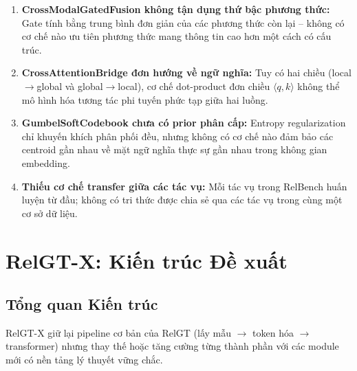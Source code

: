 \documentclass[12pt,a4paper]{article}
\begin{document}
\begin{warnbox}
\begin{enumerate}[leftmargin=1.2em]
  \item \textbf{CrossModalGatedFusion không tận dụng thứ bậc phương thức:}
        Gate tính bằng trung bình đơn giản của các phương thức còn lại
        -- không có cơ chế nào ưu tiên phương thức mang thông tin cao hơn
        một cách có cấu trúc.
  \item \textbf{CrossAttentionBridge đơn hướng về ngữ nghĩa:} Tuy có hai
        chiều (local$\to$global và global$\to$local), cơ chế dot-product đơn
        chiều $\langle q, k \rangle$ không thể mô hình hóa tương tác phi tuyến
        phức tạp giữa hai luồng.
  \item \textbf{GumbelSoftCodebook chưa có prior phân cấp:} Entropy
        regularization chỉ khuyến khích phân phối đều, nhưng không có cơ chế
        nào đảm bảo các centroid gần nhau về mặt ngữ nghĩa thực sự gần nhau
        trong không gian embedding.
  \item \textbf{Thiếu cơ chế transfer giữa các tác vụ:} Mỗi tác vụ trong
        RelBench huấn luyện từ đầu; không có tri thức được chia sẻ qua các
        tác vụ trong cùng một cơ sở dữ liệu.
\end{enumerate}
\end{warnbox}

\section{RelGT-X: Kiến trúc Đề xuất}

\subsection{Tổng quan Kiến trúc}

RelGT-X giữ lại pipeline cơ bản của RelGT (lấy mẫu $\to$ token hóa $\to$
transformer) nhưng thay thế hoặc tăng cường từng thành phần với các module
mới có nền tảng lý thuyết vững chắc.
\end{document}
